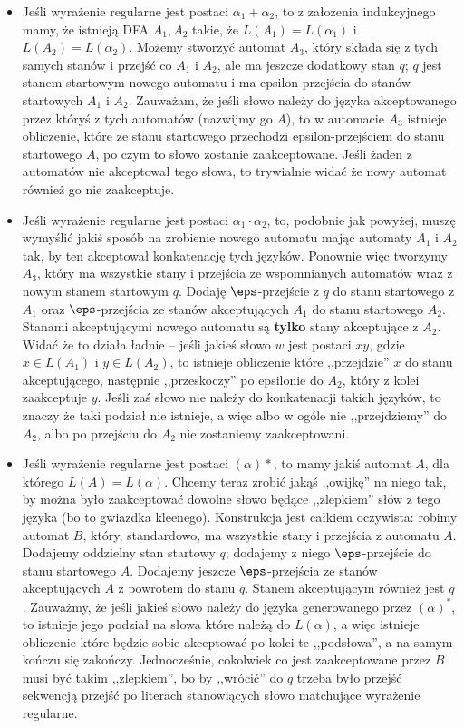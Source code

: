     \begin{itemize}
        \item Jeśli wyrażenie regularne jest postaci \( \alpha_1 + \alpha_2 \), to z założenia indukcyjnego mamy, że istnieją DFA \(A_1, A_2\) takie, że \(L(A_1) = L(\alpha_1)\) i \(L(A_2) = L(\alpha_2)\). Możemy stworzyć automat \(A_3\), który składa się z tych samych stanów i przejść co \(A_1\) i \(A_2\), ale ma jeszcze dodatkowy stan \(q\); \(q\) jest stanem startowym nowego automatu i ma epsilon przejścia do stanów startowych \(A_1\) i \(A_2\).  Zauważam, że jeśli słowo należy do języka akceptowanego przez któryś z tych automatów (nazwijmy go \(A\)), to w automacie \(A_3\) istnieje obliczenie, które ze stanu startowego przechodzi epsilon-przejściem do stanu startowego \(A\), po czym to słowo zostanie zaakceptowane. Jeśli żaden z automatów nie akceptował tego słowa, to trywialnie widać że nowy automat również go nie zaakceptuje.
        \item Jeśli wyrażenie regularne jest postaci \( \alpha_1 \cdot \alpha_2 \), to, podobnie jak powyżej, muszę wymyślić jakiś sposób na zrobienie nowego automatu mając automaty \(A_1\) i \(A_2\) tak, by ten akceptował konkatenację tych języków. Ponownie więc tworzymy \(A_3\), który ma wszystkie stany i przejścia ze wspomnianych automatów wraz z nowym stanem startowym \(q\). Dodaję \(\eps\)-przejście z \(q\) do stanu startowego z \(A_1\) oraz \(\eps\)-przejścia ze stanów akceptujących \(A_1\) do stanu startowego \(A_2\). Stanami akceptującymi nowego automatu są \textbf{tylko} stany akceptujące z \(A_2\). Widać że to działa ładnie -- jeśli jakieś słowo \(w\) jest postaci \(xy\), gdzie \(x\in L(A_1)\) i \(y \in L(A_2)\), to istnieje obliczenie które ,,przejdzie'' \(x\) do stanu akceptującego, następnie ,,przeskoczy'' po epsilonie do \(A_2\), który z kolei zaakceptuje \(y\). Jeśli zaś słowo nie należy do konkatenacji takich języków, to znaczy że taki podział nie istnieje, a więc albo w ogóle nie ,,przejdziemy'' do \(A_2\), albo po przejściu do \(A_2\) nie zostaniemy zaakceptowani. 
        \item Jeśli wyrażenie regularne jest postaci \((\alpha)*\), to mamy jakiś automat \(A\), dla którego \(L(A) = L(\alpha)\). Chcemy teraz zrobić jakąś ,,owijkę'' na niego tak, by można było zaakceptować dowolne słowo będące ,,zlepkiem'' słów z tego języka (bo to gwiazdka kleenego). Konstrukcja jest całkiem oczywista: robimy automat \(B\), który, standardowo, ma wszystkie stany i przejścia z automatu \(A\). Dodajemy oddzielny stan startowy \(q\); dodajemy z niego \(\eps\)-przejście do stanu startowego \(A\). Dodajemy jeszcze \(\eps\)-przejścia ze stanów akceptujących \(A\) z powrotem do stanu \(q\). Stanem akceptującym również jest \(q\). Zauważmy, że jeśli jakieś słowo należy do języka generowanego przez \((\alpha)^*\), to istnieje jego podział na słowa które należą do \(L(\alpha)\), a więc istnieje obliczenie które będzie sobie akceptować po kolei te ,,podsłowa'', a na samym kończu się zakończy. Jednocześnie, cokolwiek co jest zaakceptowane przez \(B\) musi być takim ,,zlepkiem'', bo by ,,wrócić'' do \(q\) trzeba było przejść sekwencją przejść po literach stanowiących słowo matchujące wyrażenie regularne. 

\end{itemize}

